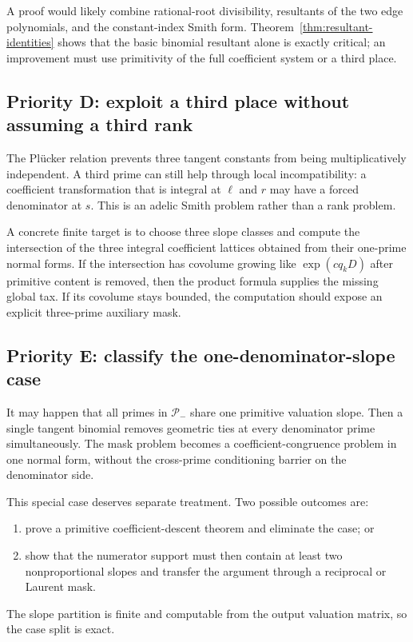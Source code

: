 \documentclass[11pt,oneside]{article}
\theoremstyle{definition}
\theoremstyle{remark}
\begin{document}
A proof would likely combine rational-root divisibility, resultants of the two edge
polynomials, and the constant-index Smith form.  Theorem~\ref{thm:resultant-identities}
shows that the basic binomial resultant alone is exactly critical; an improvement must use
primitivity of the full coefficient system or a third place.

\subsection{Priority D: exploit a third place without assuming a third rank}

The Pl\"ucker relation prevents three tangent constants from being multiplicatively
independent.  A third prime can still help through local incompatibility: a coefficient
transformation that is integral at $\ell$ and $r$ may have a forced denominator at $s$.
This is an adelic Smith problem rather than a rank problem.

A concrete finite target is to choose three slope classes and compute the intersection of the
three integral coefficient lattices obtained from their one-prime normal forms.  If the
intersection has covolume growing like $\exp(cq_kD)$ after primitive content is removed, then
the product formula supplies the missing global tax.  If its covolume stays bounded, the
computation should expose an explicit three-prime auxiliary mask.

\subsection{Priority E: classify the one-denominator-slope case}

It may happen that all primes in $\mathcal P_-$ share one primitive valuation slope.  Then a
single tangent binomial removes geometric ties at every denominator prime simultaneously.
The mask problem becomes a coefficient-congruence problem in one normal form, without the
cross-prime conditioning barrier on the denominator side.

This special case deserves separate treatment.  Two possible outcomes are:
\begin{enumerate}
\item prove a primitive coefficient-descent theorem and eliminate the case; or
\item show that the numerator support must then contain at least two nonproportional slopes
and transfer the argument through a reciprocal or Laurent mask.
\end{enumerate}
The slope partition is finite and computable from the output valuation matrix, so the case
split is exact.
\end{document}
